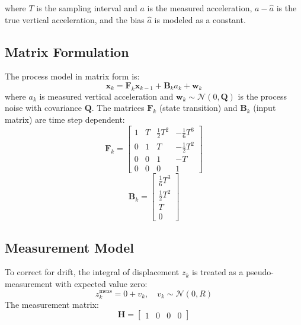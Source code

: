 \documentclass[11pt,letterpaper]{article}
\begin{document}
where $T$ is the sampling interval and $a$ is the measured acceleration, $a - \hat{a}$ is the true vertical acceleration, and the bias $\hat{a}$ is modeled as a constant.


\subsection{Matrix Formulation}

The process model in matrix form is:
\begin{equation}
\mathbf{x}_k = \mathbf{F}_k \mathbf{x}_{k-1} + \mathbf{B}_k a_k + \mathbf{w}_k
\end{equation}
where \( a_k \) is measured vertical acceleration and \( \mathbf{w}_k \sim \mathcal{N}(0, \mathbf{Q}) \) is the process noise with covariance \(  \bm{Q} \). The matrices \( \mathbf{F}_k \) (state transition) and \( \mathbf{B}_k \) (input matrix) are time step dependent:
\begin{equation}
\mathbf{F}_k =
\begin{bmatrix}
1 & T & \frac{1}{2}T^2 & -\frac{1}{6}T^3 \\
0 & 1 & T & -\frac{1}{2}T^2 \\
0 & 0 & 1 & -T \\
0 & 0 & 0 & 1
\end{bmatrix}
\end{equation}
\begin{equation}
\mathbf{B}_k =
\begin{bmatrix}
\frac{1}{6}T^3 \\
\frac{1}{2}T^2 \\
T \\
0
\end{bmatrix}
\end{equation}

\subsection{Measurement Model}
To correct for drift, the integral of displacement \( z_k \) is treated as a pseudo-measurement with expected value zero:
\[
z_k^\text{meas} = 0 + v_k, \quad v_k \sim \mathcal{N}(0, R)
\]
The measurement matrix:
\begin{equation}
\mathbf{H} = \begin{bmatrix} 1 & 0 & 0 & 0 \end{bmatrix}
\end{equation}



\end{document}
